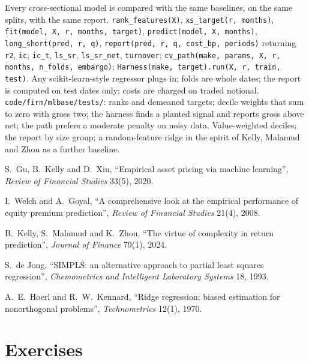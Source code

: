 \begin{build}
 Every cross-sectional model is compared with the same baselines, on the same splits, with the same
report.
 \texttt{rank\_features(X)}, \texttt{xs\_target(r, months)}, \texttt{fit(model, X, r, months,
target)}, \texttt{predict(model, X, months)}, \texttt{long\_short(pred, r, q)}, \texttt{report(pred, r, q, cost\_bp,
periods)} returning \texttt{r2}, \texttt{ic}, \texttt{ic\_t}, \texttt{ls\_sr}, \texttt{ls\_sr\_net},
\texttt{turnover}; \texttt{cv\_path(make, params, X, r, months, n\_folds, embargo)}; \texttt{Harness(make,
target).run(X, r, train, test)}.
 Any scikit-learn-style regressor plugs in; folds are whole dates; the report is computed on test dates
only; costs are charged on traded notional.
 \texttt{code/firm/mlbase/tests/}: ranks and demeaned targets; decile weights that sum to zero
with gross two; the harness finds a planted signal and reports gross above net; the path prefers a moderate penalty on
noisy data.
 Value-weighted deciles; the report by size group; a random-feature ridge in the spirit of Kelly,
Malamud and Zhou as a further baseline.
\end{build}

\begin{omsources}
\item S.~Gu, B.~Kelly and D.~Xiu, ``Empirical asset pricing via machine learning'', \emph{Review of Financial Studies}
33(5), 2020.
\item I.~Welch and A.~Goyal, ``A comprehensive look at the empirical performance of equity premium prediction'',
\emph{Review of Financial Studies} 21(4), 2008.
\item B.~Kelly, S.~Malamud and K.~Zhou, ``The virtue of complexity in return prediction'', \emph{Journal of Finance}
79(1), 2024.
\item S.~de Jong, ``SIMPLS: an alternative approach to partial least squares regression'', \emph{Chemometrics and
Intelligent Laboratory Systems} 18, 1993.
\item A.~E.~Hoerl and R.~W.~Kennard, ``Ridge regression: biased estimation for nonorthogonal problems'',
\emph{Technometrics} 12(1), 1970.
\end{omsources}

\section{Exercises}

